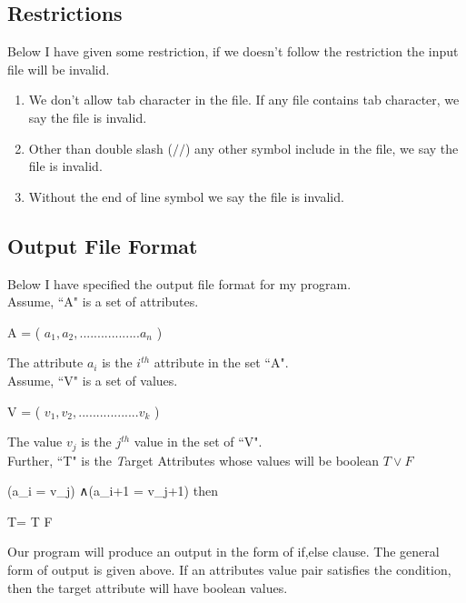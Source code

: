 \documentclass{report}
\begin{document}
\subsection{Restrictions}

Below I have given some restriction, if we doesn't follow the restriction the input file will be invalid. 
\begin{enumerate}

\item We don't allow tab character in the file. If any file contains tab character, we say the file is invalid.
\item Other than double slash ($//$) any other symbol include in the file, we say the file is invalid.
\item Without the end of line symbol we say the file is invalid.


\end{enumerate}

\pagebreak


\subsection{Output File Format}

Below I have specified the output file format for my program.\\

Assume, ``A" is a set of attributes.

A =  ( $a_1, a_2  ,................. a_n$ )

The attribute $a_i$ is the $i^{th}$ attribute in the set ``A".\\

Assume, ``V" is a set of values.

V = ( $v_1, v_2  ,................. v_k$ )

The value $v_j$ is the $j^{th}$ value in the set of ``V".\\

Further, ``T" is the \emph Target Attributes whose values will be boolean 
$T \vee F$


\begin{program} 

	\IF(a_i = v_j) ∧\wedge (a_i+1 = v_j+1) then
	
			T=  T \vee F                                      

\end{program}

Our program will produce an output in the form of if,else clause. The general form of output is given above.
If an attributes value pair satisfies the condition, then the target attribute will have boolean values.\\
\end{document}
